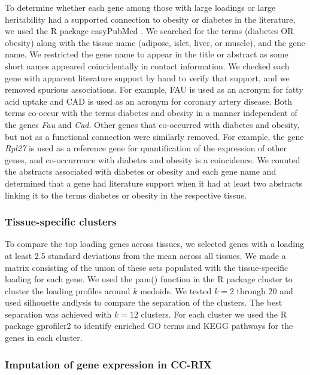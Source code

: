 \documentclass[
]{article}
\begin{document}
To determine whether each gene among those with large loadings or large
heritability had a supported connection to obesity or diabetes in the
literature, we used the R package easyPubMed \cite{easyPubMed}. We
searched for the terms (diabetes OR obesity) along with the tissue name
(adipose, islet, liver, or muscle), and the gene name. We restricted the
gene name to appear in the title or abstract as some short names
appeared coincidentally in contact information. We checked each gene
with apparent literature support by hand to verify that support, and we
removed spurious associations. For example, FAU is used as an acronym
for fatty acid uptake and CAD is used as an acronym for coronary artery
disease. Both terms co-occur with the terms diabetes and obesity in a
manner independent of the genes \textit{Fau} and \textit{Cad}. Other
genes that co-occurred with diabetes and obesity, but not as a
functional connection were similarly removed. For example, the gene
\textit{Rpl27} is used as a reference gene for quantification of the
expression of other genes, and co-occurrence with diabetes and obesity
is a coincidence. We counted the abstracts associated with diabetes or
obesity and each gene name and determined that a gene had literature
support when it had at least two abstracts linking it to the terms
diabetes or obesity in the respective tissue.

\subsubsection{Tissue-specific clusters}\label{tissue-specific-clusters}

To compare the top loading genes across tissues, we selected genes with
a loading at least 2.5 standard deviations from the mean across all
tissues. We made a matrix consisting of the union of these sets
populated with the tissue-specific loading for each gene. We used the
pam() function in the R package cluster \cite{Rcluster} to cluster the
loading profiles around \(k\) medoids. We tested \(k = 2\) through 20
and used silhouette andlysis to compare the separation of the clusters.
The best separation was achieved with \(k = 12\) clusters. For each
cluster we used the R package gprofiler2 \cite{Rgprofiler2} to identify
enriched GO terms and KEGG pathways for the genes in each cluster.

\subsubsection{Imputation of gene expression in
CC-RIX}\label{imputation-of-gene-expression-in-cc-rix}
\end{document}
